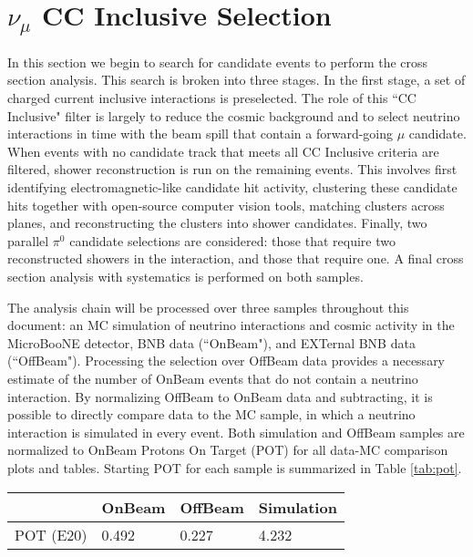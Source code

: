 \clearpage
\section{ $\nu_{\mu}$ CC Inclusive Selection}


\par In this section we begin to search for candidate events to perform the cross section analysis. This search is broken into three stages.  In the first stage, a set of charged current inclusive interactions is preselected. The role of this ``CC Inclusive" filter is largely to reduce the cosmic background and to select neutrino interactions in time with the beam spill that contain a forward-going $\mu$ candidate.  When events with no candidate track that meets all CC Inclusive criteria are filtered, shower reconstruction is run on the remaining events.  This involves first identifying electromagnetic-like candidate hit activity, clustering these candidate hits together with open-source computer vision tools, matching clusters across planes, and reconstructing the clusters into shower candidates.  Finally, two parallel $\pi^0$ candidate selections are considered: those that require two reconstructed showers in the interaction, and those that require one.  A final cross section analysis with systematics is performed on both samples.
\par The analysis chain will be processed over three samples throughout this document: an MC simulation of neutrino interactions and cosmic activity in the MicroBooNE detector, BNB data (``OnBeam"), and EXTernal BNB data (``OffBeam").  Processing the selection over OffBeam data provides a necessary estimate of the number of OnBeam events that do not contain a neutrino interaction.  By normalizing OffBeam to OnBeam data and subtracting, it is possible to directly compare data to the MC sample, in which a neutrino interaction is simulated in every event.  Both simulation and OffBeam samples are normalized to OnBeam Protons On Target (POT) for all data-MC comparison plots and tables. Starting POT for each sample is summarized in Table \ref{tab:pot}.

\begin{table}[H] 
 \centering
 \begin{tabular}{| l | l | l | l |}
  \hline
   & OnBeam & OffBeam & Simulation \\ [0.1ex] \hline
POT (E20) & 0.492 & 0.227 & 4.232 \\ \hline
 \end{tabular}
\end{table}


